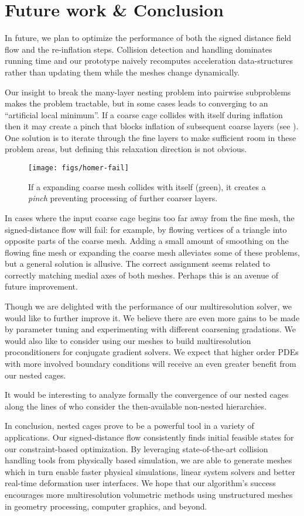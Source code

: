 \section{Future work \& Conclusion}
\label{sec:conclusion}
%
In future, we plan to optimize the performance of both the signed distance
field flow and the re-inflation steps.
%
Collision detection and handling dominates running time and our prototype
naively recomputes acceleration data-structures rather than updating them while
the meshes change dynamically.

Our insight to break the many-layer nesting problem into pairwise subproblems
makes the problem tractable, but in some cases leads to converging to an
``artificial local minimum''. If a coarse cage collides with itself during
inflation then it may create a pinch that blocks inflation of subsequent coarse
layers (see ).
%
One solution is to iterate through the fine layers to make sufficient room in
these problem areas, but defining this relaxation direction is not obvious.

\begin{figure}
  \texttt{[image: figs/homer-fail]}
  \caption{If a expanding coarse mesh collides with itself (green), it creates
  a \emph{pinch} preventing processing of further coarser layers.}
  \label{fig:homer}
\end{figure}

In cases where the input coarse cage begins too far away from the fine mesh,
the signed-distance flow will fail: for example, by flowing vertices of a
triangle into opposite parts of the coarse mesh. 
%
Adding a small amount of smoothing on the flowing fine mesh or expanding the
coarse mesh alleviates some of these problems, but a general solution is
allusive.
%
The correct assignment seems related to correctly matching medial axes of both
meshes. Perhaps this is an avenue of future improvement.

Though we are delighted with the performance of our multiresolution solver, 
we would like to further improve it. We believe there are even more gains to be
made by parameter tuning and experimenting with different coarsening
gradations. We would also like to consider using our meshes to build
multiresolution proconditioners for conjugate gradient solvers.
%
We expect that higher order PDEs with more involved boundary conditions will
receive an even greater benefit from our nested cages.

It would be interesting to analyze formally the convergence of our nested cages
along the lines of \cite{chan1996convergence} who consider the then-available
non-nested hierarchies.


In conclusion, nested cages prove to be a powerful tool in a variety of
applications. 
%
Our signed-distance flow consistently finds initial feasible states for our
constraint-based optimization.
%
By leveraging state-of-the-art collision handling tools from physically based
simulation, we are able to generate meshes which in turn enable faster physical
simulations, linear system solvers and better real-time deformation user
interfaces.
%
We hope that our algorithm's success encourages more multiresolution volumetric
methods using unstructured meshes in geometry processing, computer graphics,
and beyond.
